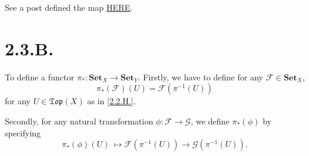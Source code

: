 See a post defined the map \href{https://math.stackexchange.com/questions/1387214/the-induced-map-on-stalks-is-well-defined}{HERE}.

\section{2.3.B.}
To define a functor $\pi_{\ast}:\textbf{Set}_X\to\textbf{Set}_Y$.
Firstly, we have to define for any $\mathscr F\in \textbf{Set}_X$, 
\[\pi_{\ast}(\mathscr F)(U)=\mathscr F(\pi^{-1}(U))\] for any $U\in \mathfrak{Top}(X)$ as in \ref{2.2.H.}. 

Secondly, for any natural transformation $\phi:\mathscr F\to\mathscr G$, we define $\pi_{\ast}(\phi)$ by specifying 
\[\pi_{\ast}(\phi)(U) ~\mapsto \mathscr F(\pi^{-1}(U))\to\mathscr G(\pi^{-1}(U)).\]

